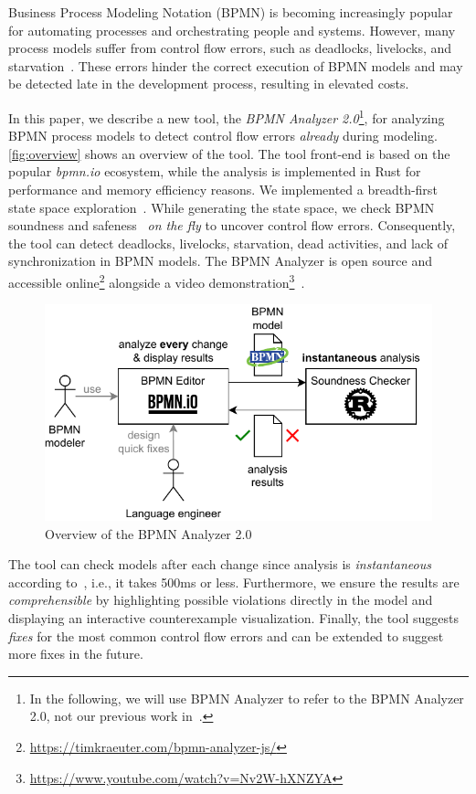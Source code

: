 \documentclass[
onecolumn, %
]{ceurart}
\begin{document}
Business Process Modeling Notation (BPMN) is becoming increasingly popular for automating processes and orchestrating people and systems.
However, many process models suffer from control flow errors, such as deadlocks, livelocks, and starvation~\cite{fahlandAnalysisDemandInstantaneous2011}.
These errors hinder the correct execution of BPMN models and may be detected late in the development process, resulting in elevated costs.

In this paper, we describe a new tool, the \textit{BPMN Analyzer 2.0}\footnote{
In the following, we will use BPMN Analyzer to refer to the BPMN Analyzer 2.0, not our previous work in~\cite{krauterHigherorderTransformationApproach2024}.}, for analyzing BPMN process models to detect control flow errors \textit{already} during modeling.
\autoref{fig:overview} shows an overview of the tool.
The tool front-end is based on the popular \textit{bpmn.io} ecosystem, while the analysis is implemented in Rust for performance and memory efficiency reasons.
We implemented a breadth-first state space exploration~\cite{clarkeHandbookModelChecking2018}.
While generating the state space, we check BPMN soundness and safeness~\cite{corradiniClassificationBPMNCollaborations2018} \textit{on the fly} to uncover control flow errors.
Consequently, the tool can detect deadlocks, livelocks, starvation, dead activities, and lack of synchronization in BPMN models.
The BPMN Analyzer is open source and accessible online\footnote{\url{https://timkraeuter.com/bpmn-analyzer-js/}} alongside a video demonstration\footnote{\url{https://www.youtube.com/watch?v=Nv2W-hXNZYA}}~\cite{krauterInstantaneousComprehensibleFixable2024}.

\begin{figure}[ht]
	\centering
	\includegraphics[width=0.5\linewidth]{images/overview}
	\caption{Overview of the BPMN Analyzer 2.0}
	\label{fig:overview}
\end{figure}

The tool can check models after each change since analysis is \textit{instantaneous} according to~\cite{fahlandAnalysisDemandInstantaneous2011}, i.e., it takes 500ms or less.
Furthermore, we ensure the results are \textit{comprehensible} by highlighting possible violations directly in the model and displaying an interactive counterexample visualization.
Finally, the tool suggests \textit{fixes} for the most common control flow errors and can be extended to suggest more fixes in the future.
\end{document}
